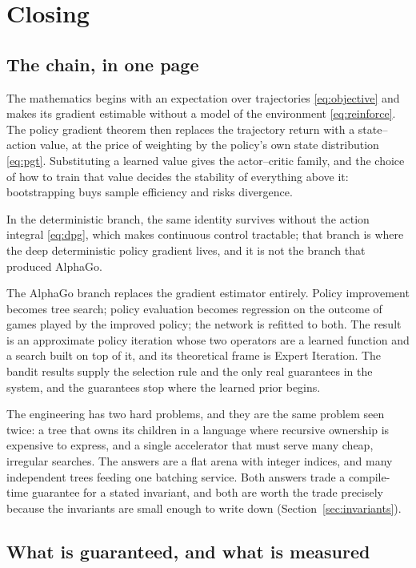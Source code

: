 \section{Closing}
\label{sec:closing}

\subsection{The chain, in one page}

The mathematics begins with an expectation over trajectories
\eqref{eq:objective} and makes its gradient estimable without a model of the
environment \eqref{eq:reinforce}. The policy gradient theorem then replaces the
trajectory return with a state--action value, at the price of weighting by the
policy's own state distribution \eqref{eq:pgt}. Substituting a learned value
gives the actor--critic family, and the choice of how to train that value decides
the stability of everything above it: bootstrapping buys sample efficiency and
risks divergence.

In the deterministic branch, the same identity survives without the action
integral \eqref{eq:dpg}, which makes continuous control tractable; that branch is
where the deep deterministic policy gradient lives, and it is not the branch that
produced AlphaGo.

The AlphaGo branch replaces the gradient estimator entirely. Policy improvement
becomes tree search; policy evaluation becomes regression on the outcome of games
played by the improved policy; the network is refitted to both. The result is an
approximate policy iteration whose two operators are a learned function and a
search built on top of it, and its theoretical frame is Expert Iteration. The
bandit results supply the selection rule and the only real guarantees in the
system, and the guarantees stop where the learned prior begins.

The engineering has two hard problems, and they are the same problem seen twice:
a tree that owns its children in a language where recursive ownership is
expensive to express, and a single accelerator that must serve many cheap,
irregular searches. The answers are a flat arena with integer indices, and many
independent trees feeding one batching service. Both answers trade a
compile-time guarantee for a stated invariant, and both are worth the trade
precisely because the invariants are small enough to write down
(Section~\ref{sec:invariants}).

\subsection{What is guaranteed, and what is measured}

